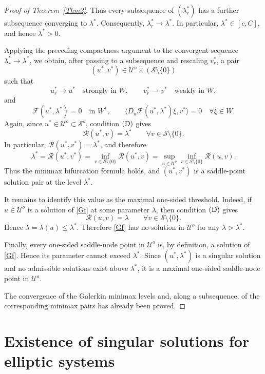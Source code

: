 \documentclass[preprint,10pt]{elsarticle}
\numberwithin{equation}{section}
\begin{document}
\begin{proof}[Proof of Theorem~\ref{Thm2}]
	Thus every subsequence of \((\lambda_r^*)\) has a further subsequence
	converging to \(\lambda^*\). Consequently, \(\lambda_r^*\to\lambda^*\).
	In particular, \(\lambda^*\in[c,C]\), and hence \(\lambda^*>0\).
	
	Applying the preceding compactness argument to the convergent sequence
	\(\lambda_r^*\to\lambda^*\), we obtain, after passing to a subsequence and
	rescaling \(v_r^*\), a pair
	\[
	(u^*,v^*)\in\mathcal U^o\times(\mathcal S\setminus\{0\})
	\]
	such that
	\[
	u_r^*\to u^* \quad\text{strongly in }W,
	\qquad
	v_r^*\rightharpoonup v^* \quad\text{weakly in }W,
	\]
	and
	\[
	\mathcal F(u^*,\lambda^*)=0
	\quad\text{in }W^*,
	\qquad
	\bigl\langle
	D_u\mathcal F(u^*,\lambda^*)\xi,v^*
	\bigr\rangle=0
	\quad \forall \xi\in W .
	\]
	Again, since \(u^*\in\mathcal U^o\subset\mathcal S^o\), condition
	\({\rm (D)}\) gives
	\[
	\mathcal R(u^*,v)=\lambda^*
	\qquad
	\forall v\in\mathcal S\setminus\{0\}.
	\]
	In particular, \(\mathcal R(u^*,v^*)=\lambda^*\), and therefore
	\[
	\lambda^*
	=
	\mathcal R(u^*,v^*)
	=
	\inf_{v\in\mathcal S\setminus\{0\}}\mathcal R(u^*,v)
	=
	\sup_{u\in\mathcal U^o}
	\inf_{v\in\mathcal S\setminus\{0\}}
	\mathcal R(u,v).
	\]
	Thus the minimax bifurcation formula holds, and \((u^*,v^*)\) is a
	saddle-point solution pair at the level \(\lambda^*\).
	
	It remains to identify this value as the maximal one-sided threshold.
	Indeed, if \(u\in\mathcal U^o\) is a solution of \eqref{Gf} at some
	parameter \(\lambda\), then condition \({\rm (D)}\) gives
	\[
	\mathcal R(u,v)=\lambda
	\qquad
	\forall v\in\mathcal S\setminus\{0\}.
	\]
	Hence \(\lambda=\lambda(u)\le\lambda^*\). Therefore \eqref{Gf} has no
	solution in \(\mathcal U^o\) for any \(\lambda>\lambda^*\).
	
	Finally, every one-sided saddle-node point in \(\mathcal U^o\) is, by
	definition, a solution of \eqref{Gf}. Hence its parameter cannot exceed
	\(\lambda^*\). Since \((u^*,\lambda^*)\) is a singular solution and no
	admissible solutions exist above \(\lambda^*\), it is a maximal one-sided
	saddle-node point in \(\mathcal U^o\).
	
	The convergence of the Galerkin minimax levels and, along a subsequence,
	of the corresponding minimax pairs has already been proved.
\end{proof}



\section{Existence of singular solutions for elliptic systems}
\label{sec.4}
\end{document}

